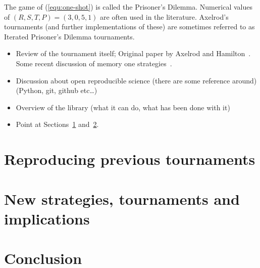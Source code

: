 \documentclass{article}
\begin{document}
The game of (\ref{equ:one-shot}) is called the Prisoner's Dilemma. Numerical
values of \((R,S,T,P)=(3,0,5,1)\) are often used in the literature. Axelrod's
tournaments (and further implementations of these) are sometimes referred to as
Iterated Prisoner's Dilemma tournaments.

\begin{itemize}
\item Review of the tournament itself;
      Original paper by Axelrod and Hamilton~\cite{1981-Axelrod-Hamilton}.
      Some recent discussion of memory one strategies~\cite{press2012iterated, stewart2012extortion}.

\item Discussion about open reproducible science (there are some reference
      around) (Python, git, github etc\dots)
\item Overview of the library (what it can do, what has been done with it)
\item Point at Sections~\ref{sec:reproducing-previous-tournaments}
      and~\ref{sec:new-strategies-and-implications}.
\end{itemize}

\section{Reproducing previous tournaments}\label{sec:reproducing-previous-tournaments}

\section{New strategies, tournaments and implications}\label{sec:new-strategies-and-implications}

\section{Conclusion}\label{sec:conclusion}

\printbibliography
\end{document}
